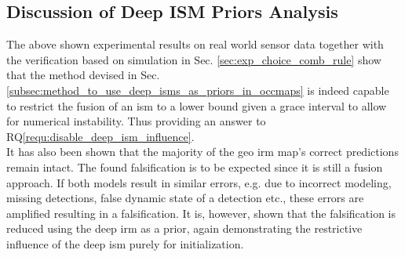 \subsection{Discussion of Deep ISM Priors Analysis}
\label{subsec:discussion_of_prior_analy}
The above shown experimental results on real world sensor data together with the verification based on simulation in Sec. \ref{sec:exp_choice_comb_rule} show that the method devised in Sec. \ref{subsec:method_to_use_deep_isms_as_priors_in_occmaps} is indeed capable to restrict the fusion of an \gls{ism} to a lower bound given a grace interval to allow for numerical instability. Thus providing an answer to RQ\ref{requ:disable_deep_ism_influence}.\\
It has also been shown that the majority of the geo \gls{irm} map's correct predictions remain intact. The found falsification is to be expected since it is still a fusion approach. If both models result in similar errors, e.g. due to incorrect modeling, missing detections, false dynamic state of a detection etc., these errors are amplified resulting in a falsification. It is, however, shown that the falsification is reduced using the deep \gls{irm} as a prior, again demonstrating the restrictive influence of the deep \gls{ism} purely for initialization.